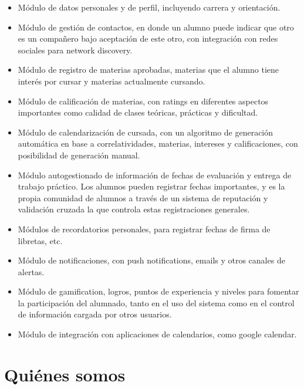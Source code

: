 \documentclass[a4paper,11pt]{article}
\begin{document}
\begin{itemize}
    \item Módulo de datos personales y de perfil, incluyendo carrera y
      orientación.

    \item Módulo de gestión de contactos, en donde un alumno puede indicar que
      otro es un compañero bajo aceptación de este otro, con integración con
      redes sociales para network discovery.

    \item Módulo de registro de materias aprobadas, materias que el alumno
      tiene interés por cursar y materias actualmente cursando.

    \item Módulo de calificación de materias, con ratings en diferentes
      aspectos importantes como calidad de clases teóricas, prácticas y
      dificultad.

    \item Módulo de calendarización de cursada, con un algoritmo de generación
      automática en base a correlatividades, materias, intereses y
      calificaciones, con posibilidad de generación manual.

    \item Módulo autogestionado de información de fechas de evaluación y
      entrega de trabajo práctico. Los alumnos pueden registrar fechas
      importantes, y es la propia comunidad de alumnos a través de un sistema
      de reputación y validación cruzada la que controla estas registraciones
      generales.

    \item Módulos de recordatorios personales, para registrar fechas de firma
      de libretas, etc.

    \item Módulo de notificaciones, con push notifications, emails y otros
      canales de alertas.

    \item Módulo de gamification, logros, puntos de experiencia y niveles para
      fomentar la participación del alumnado, tanto en el uso del sistema como
      en el control de información cargada por otros usuarios.

    \item Módulo de integración con aplicaciones de calendarios, como google
      calendar.
\end{itemize}

\section*{{\Large{}Quiénes somos}}
\end{document}
